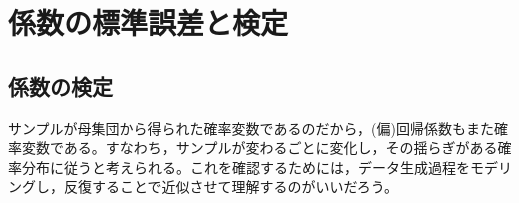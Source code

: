\documentclass[
  a4paper,
]{ltjsbook}
\begin{document}
\section{係数の標準誤差と検定}\label{ux4fc2ux6570ux306eux6a19ux6e96ux8aa4ux5deeux3068ux691cux5b9a}

\subsection{係数の検定}\label{ux4fc2ux6570ux306eux691cux5b9a}

サンプルが母集団から得られた確率変数であるのだから，(偏)回帰係数もまた確率変数である。すなわち，サンプルが変わるごとに変化し，その揺らぎがある確率分布に従うと考えられる。これを確認するためには，データ生成過程をモデリングし，反復することで近似させて理解するのがいいだろう。
\end{document}
